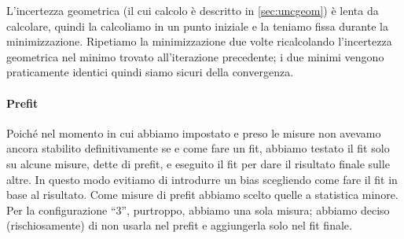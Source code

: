 L'incertezza geometrica (il cui calcolo è descritto in \autoref{sec:uncgeom})
è lenta da calcolare, quindi la calcoliamo in un punto iniziale e la teniamo fissa durante la minimizzazione.
Ripetiamo la minimizzazione due volte ricalcolando l'incertezza geometrica nel minimo trovato all'iterazione precedente;
i due minimi vengono praticamente identici quindi siamo sicuri della convergenza.

\paragraph{Prefit}

Poiché nel momento in cui abbiamo impostato e preso le misure
non avevamo ancora stabilito definitivamente se e come fare un fit,
abbiamo testato il fit solo su alcune misure, dette di prefit,
e eseguito il fit per dare il risultato finale sulle altre.
In questo modo evitiamo di introdurre un bias scegliendo come fare il fit in base al risultato.
Come misure di prefit abbiamo scelto quelle a statistica minore.
Per la configurazione ``3'', purtroppo, abbiamo una sola misura;
abbiamo deciso (rischiosamente) di non usarla nel prefit e aggiungerla solo nel fit finale.


